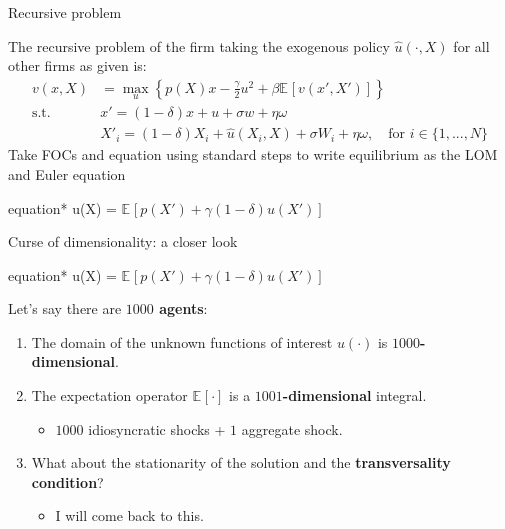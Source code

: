\documentclass[aspectratio=169,10pt]{beamer}
\newcommand{\emphcolor}[1]{\textbf{\textcolor{emphcolorval}{#1}}}
\newcommand{\expec}[2][]{\ensuremath{\mathbb{E}_{{#1}}\left[ {#2} \right]}}
\begin{document}
	\begin{frame}{Recursive problem}
	
	
	The recursive problem of the firm taking the exogenous policy $\hat{u}(\cdot, X)$ for all other firms as given is:
	\begin{align*}
		v(x,X)       & =\max_{u}\left\{p(X)x -  \frac{\gamma}{2} u^2 + \beta \expec{v(x',X')}\right\}                      \\
		\text{s.t. } & x' = (1-\delta)x + u + \sigma w + \eta \omega                                                       \\
		& X'_i = (1-\delta)X_i + \hat{u}(X_i,X) + \sigma W_i + \eta \omega,\quad\text{for } i \in \{1,...,N\}\end{align*}
	Take FOCs and equation using standard steps to write equilibrium as the LOM and Euler equation
	\begin{empheq}[box=\tcbhighmath]{equation*}
		\gamma u(X) = \beta \expec{p(X')+\gamma (1-\delta) u(X') }
	\end{empheq}
	

\end{frame}


\begin{frame}{Curse of dimensionality: a closer look }
	\begin{empheq}[box=\tcbhighmath]{equation*}
		\gamma u(X) = \beta \expec{p(X')+\gamma (1-\delta) u(X') }
	\end{empheq}
Let's say there are \emphcolor{$1000$ agents}:
\begin{enumerate}
	\item The domain of the unknown functions of interest $u(\cdot)$ is \emphcolor{$1000$-dimensional}.\vspace{0.1in}
	\item The expectation operator $\expec{\cdot}$  is a \emphcolor{$1001$-dimensional} integral.\vspace{0.1in}
	\begin{itemize}
		\item $1000$ idiosyncratic shocks + $1$ aggregate shock.\vspace{0.1in}
	\end{itemize}
	\item What about the stationarity of the solution and the \emphcolor{transversality condition}?\vspace{0.1in}
	\begin{itemize}
		\item I will come back to this.
	\end{itemize}
\end{enumerate}
	
\end{frame}
	
\end{document}
